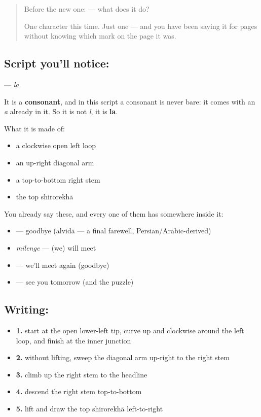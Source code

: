 \label{lesson:HI-S121-letter-la}



\begin{quote}
Before the new one:  — what does it do?

One character this time. Just one — and you have been saying it for pages without knowing which mark on the page it was.
\end{quote}

\subsection*{Script you'll notice: }
\textbf{} — \emph{la}.

It is a \textbf{consonant}, and in this script a consonant is never bare: it comes with an \emph{a} already in it. So it is not \emph{l}, it is \textbf{la}.

What it is made of:

\begin{itemize}
\raggedright
  \item a clockwise open left loop
  \item an up-right diagonal arm
  \item a top-to-bottom right stem
  \item the top shirorekhā
\end{itemize}

You already say these, and every one of them has  somewhere inside it:

\begin{itemize}
\raggedright
  \item \textbf{} — goodbye (alvidā — a final farewell, Persian/Arabic-derived)
  \item \textbf{} \emph{milenge} — (we) will meet
  \item \textbf{ } — we'll meet again (goodbye)
  \item \textbf{  } — see you tomorrow (and the  puzzle)
\end{itemize}

\subsection*{Writing: }

\begin{itemize}
\raggedright
  \item \textbf{1.} start at the open lower-left tip, curve up and clockwise around the left loop, and finish at the inner junction
  \item \textbf{2.} without lifting, sweep the diagonal arm up-right to the right stem
  \item \textbf{3.} climb up the right stem to the headline
  \item \textbf{4.} descend the right stem top-to-bottom
  \item \textbf{5.} lift and draw the top shirorekhā left-to-right
\end{itemize}

